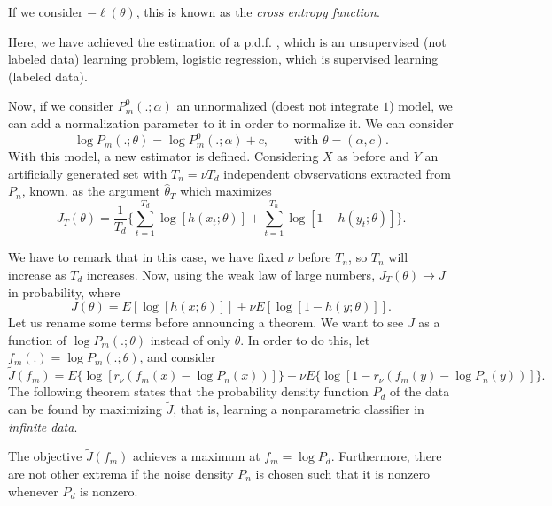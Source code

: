 \begin{remark}
If we consider $-\ell(\theta)$, this is known as the \emph{cross entropy function}.
\end{remark}

\begin{remark}
    Here, we have achieved the estimation of a p.d.f. , which is an unsupervised (not labeled data) learning problem, logistic regression, which is supervised learning (labeled data).
\end{remark}

Now, if we consider $P_m^0(.;\alpha)$ an unnormalized (doest not integrate $1$) model, we can add a normalization parameter to it in order to normalize it. We can consider
\[
\log P_m(.;\theta) = \log P_m^0(.;\alpha ) + c  , \quad \quad \text{with } \theta=(\alpha,c).
\]
With this model, a new estimator is defined. Considering $X$ as before and $Y$ an artificially generated set with $T_n = \nu T_d$ independent obvservations extracted from $P_n$, known. as the argument $\hat{\theta}_T$ which maximizes
\[
J_T(\theta) = \frac{1}{T_d}\{\sum_{t = 1}^{T_d} \log[h(x_t;\theta)] + \sum_{t=1}^{T_n}\log[1-h(y_t;\theta)]\}.
\]

We have to remark that in this case, we have fixed $\nu$ before $T_n$, so $T_n$ will increase as $T_d$ increases. Now, using the weak law of large numbers, $J_T(\theta) \to J$ in probability, where
\[
J(\theta) = E\left[\log[h(x;\theta)]\right] + \nu E\left[\log[1-h(y;\theta)]\right].
\]
Let us rename some terms before announcing a theorem. We want to see $J$ as a function of $\log P_m(.;\theta)$ instead of only $\theta$. In order to do this, let $f_m(.) = \log P_m(.;\theta)$, and consider
\[
\tilde{J}(f_m) = E\{\log[r_\nu (f_m(x) - \log P_n(x))]\} + \nu E\{\log [1- r_\nu(f_m(y) - \log P_n(y))]\}.    
\]
The following theorem states that the probability density function $P_d$ of the data can be found by maximizing $\tilde{J}$, that is, learning a nonparametric classifier in \emph{infinite data}.

\begin{nth}
The objective $\tilde{J}(f_m)$ achieves a maximum at $f_m = \log P_d$. Furthermore, there are not other extrema if the noise density $P_n$ is chosen such that it is nonzero whenever $P_d$ is nonzero.
\end{nth}